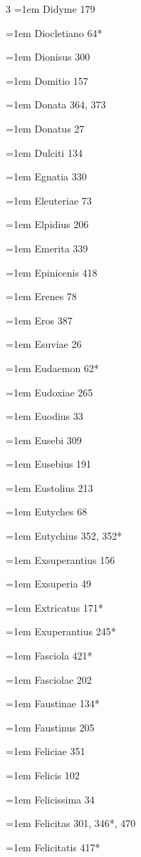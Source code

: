 \begin{multicols}{3}
\hangindent=1em Didyme 179\par
\hangindent=1em Diocletiano 64*\par
\hangindent=1em Dionisus 300\par
\hangindent=1em Domitio 157\par
\hangindent=1em Donata 364, 373\par
\hangindent=1em Donatus 27\par
\hangindent=1em Dulciti 134\par
\hangindent=1em Egnatia 330\par
\hangindent=1em Eleuteriae 73\par
\hangindent=1em Elpidius 206\par
\hangindent=1em Emerita 339\par
\hangindent=1em Epinicenis 418\par
\hangindent=1em Erenes 78\par
\hangindent=1em Eros 387\par
\hangindent=1em Esuviae 26\par
\hangindent=1em Eudaemon 62*\par
\hangindent=1em Eudoxiae 265\par
\hangindent=1em Euodius 33\par
\hangindent=1em Eusebi 309\par
\hangindent=1em Eusebius 191\par
\hangindent=1em Eustolius 213\par
\hangindent=1em Eutyches 68\par
\hangindent=1em Eutychius 352, 352*\par
\hangindent=1em Exsuperantius 156\par
\hangindent=1em Exsuperia 49\par
\hangindent=1em Extricatus 171*\par
\hangindent=1em Exuperantius 245*\par
\hangindent=1em Fasciola 421*\par
\hangindent=1em Fasciolae 202\par
\hangindent=1em Faustinae 134*\par
\hangindent=1em Faustinus 205\par
\hangindent=1em Feliciae 351\par
\hangindent=1em Felicis 102\par
\hangindent=1em Felicissima 34\par
\hangindent=1em Felicitas 301, 346*, 470\par
\hangindent=1em Felicitatis 417*\par

\end{multicols}
